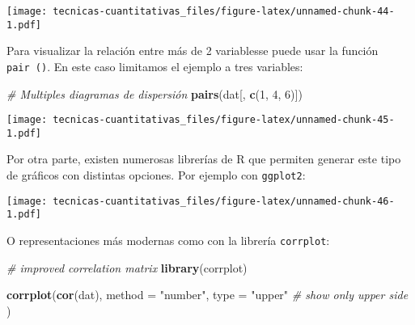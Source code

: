 \documentclass[
]{book}
\newenvironment{Shaded}{\begin{snugshade}}{\end{snugshade}}
\newcommand{\CommentTok}[1]{\textcolor[rgb]{0.56,0.35,0.01}{\textit{#1}}}
\newcommand{\DataTypeTok}[1]{\textcolor[rgb]{0.13,0.29,0.53}{#1}}
\newcommand{\DecValTok}[1]{\textcolor[rgb]{0.00,0.00,0.81}{#1}}
\newcommand{\KeywordTok}[1]{\textcolor[rgb]{0.13,0.29,0.53}{\textbf{#1}}}
\newcommand{\NormalTok}[1]{#1}
\newcommand{\OperatorTok}[1]{\textcolor[rgb]{0.81,0.36,0.00}{\textbf{#1}}}
\newcommand{\StringTok}[1]{\textcolor[rgb]{0.31,0.60,0.02}{#1}}
\begin{document}
\texttt{[image: tecnicas-cuantitativas\_files/figure-latex/unnamed-chunk-44-1.pdf]}

Para visualizar la relación entre más de 2 variablesse puede usar la función \texttt{pair\ ()}. En este caso limitamos el ejemplo a tres variables:

\begin{Shaded}
\begin{Highlighting}[]
\CommentTok{# Multiples diagramas de dispersión}
\KeywordTok{pairs}\NormalTok{(dat[, }\KeywordTok{c}\NormalTok{(}\DecValTok{1}\NormalTok{, }\DecValTok{4}\NormalTok{, }\DecValTok{6}\NormalTok{)])}
\end{Highlighting}
\end{Shaded}

\texttt{[image: tecnicas-cuantitativas\_files/figure-latex/unnamed-chunk-45-1.pdf]}

Por otra parte, existen numerosas librerías de R que permiten generar este tipo de gráficos con distintas opciones. Por ejemplo con \texttt{ggplot2}:

\begin{Shaded}
\end{Shaded}

\texttt{[image: tecnicas-cuantitativas\_files/figure-latex/unnamed-chunk-46-1.pdf]}

O representaciones más modernas como con la librería \texttt{corrplot}:

\begin{Shaded}
\begin{Highlighting}[]
\CommentTok{# improved correlation matrix}
\KeywordTok{library}\NormalTok{(corrplot)}

\KeywordTok{corrplot}\NormalTok{(}\KeywordTok{cor}\NormalTok{(dat),}
         \DataTypeTok{method =} \StringTok{"number"}\NormalTok{,}
         \DataTypeTok{type =} \StringTok{"upper"} \CommentTok{# show only upper side}
\NormalTok{         )}
\end{Highlighting}
\end{Shaded}
\end{document}
